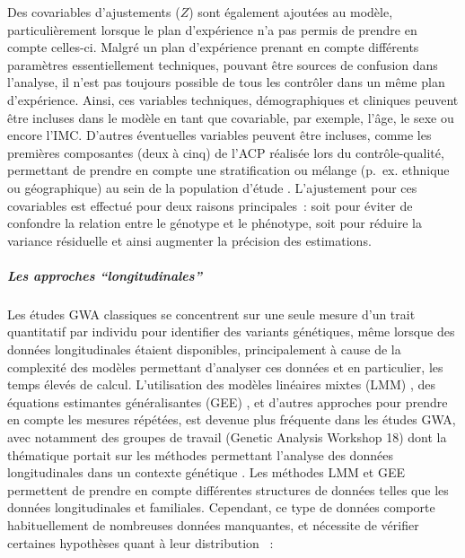\documentclass[11pt,a4paper,notrimn]{krantz}
\let\oldsubparagraph\subparagraph
\renewcommand{\subparagraph}[1]{\oldsubparagraph{#1}\mbox{}}
\theoremstyle{definition}
\theoremstyle{definition}
\theoremstyle{remark}
\begin{document}
Des covariables d'ajustements (\(Z\)) sont également ajoutées au modèle,
particulièrement lorsque le plan d'expérience n'a pas permis de prendre
en compte celles-ci. Malgré un plan d'expérience prenant en compte
différents paramètres essentiellement techniques, pouvant être sources
de confusion dans l'analyse, il n'est pas toujours possible de tous les
contrôler dans un même plan d'expérience. Ainsi, ces variables
techniques, démographiques et cliniques peuvent être incluses dans le
modèle en tant que covariable, par exemple, l'âge, le sexe ou encore
l'IMC. D'autres éventuelles variables peuvent être incluses, comme les
premières composantes (deux à cinq) de l'ACP réalisée lors du
contrôle-qualité, permettant de prendre en compte une stratification ou
mélange (p.~ex. ethnique ou géographique) au sein de la population
d'étude
\citep{novembre_genes_2008, clayton_population_2005, bouaziz_accounting_2011}.
L'ajustement pour ces covariables est effectué pour deux raisons
principales~: soit pour éviter de confondre la relation entre le
génotype et le phénotype, soit pour réduire la variance résiduelle et
ainsi augmenter la précision des estimations.

\subparagraph{\texorpdfstring{Les approches
``longitudinales''}{Les approches longitudinales}}\label{les-approches-longitudinales}

Les études GWA classiques se concentrent sur une seule mesure d'un trait
quantitatif par individu pour identifier des variants génétiques, même
lorsque des données longitudinales étaient disponibles, principalement à
cause de la complexité des modèles permettant d'analyser ces données et
en particulier, les temps élevés de calcul. L'utilisation des modèles
linéaires mixtes (LMM)
\citep{laird_random-effects_1982, liang_longitudinal_1986}, des
équations estimantes généralisantes (GEE)
\citep{ziegler_generalised_1998}, et d'autres approches pour prendre en
compte les mesures répétées, est devenue plus fréquente dans les études
GWA, avec notamment des groupes de travail (Genetic Analysis Workshop
18) dont la thématique portait sur les méthodes permettant l'analyse des
données longitudinales dans un contexte génétique
\citep{almasy_data_2014, beyene_longitudinal_2014, wu_mixed-effects_2014}.
Les méthodes LMM et GEE permettent de prendre en compte différentes
structures de données telles que les données longitudinales et
familiales. Cependant, ce type de données comporte habituellement de
nombreuses données manquantes, et nécessite de vérifier certaines
hypothèses quant à leur distribution \citep{graham_missing_2009}~:
\end{document}
